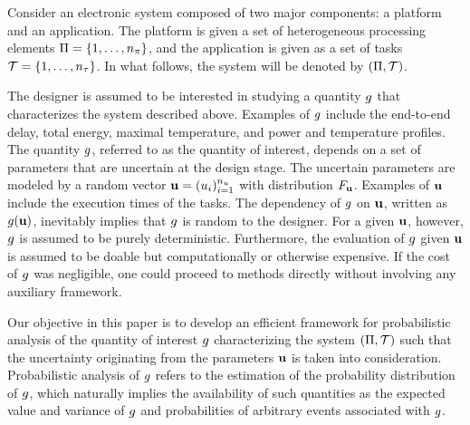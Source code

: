 Consider an electronic system composed of two major components: a platform and
an application. The platform is given a set of heterogeneous processing elements
$\Pi = \{ 1, \dots, {n_\pi} \}$, and the application is given as a set of tasks
$\mathcal{T} = \{ 1, \dots, {n_\tau} \}$. In what follows, the system will be denoted by
$(\Pi, \mathcal{T})$.

The designer is assumed to be interested in studying a quantity $g$ that
characterizes the system described above. Examples of $g$ include the
end-to-end delay, total energy, maximal temperature, and power and temperature
profiles. The quantity $g$, referred to as the quantity of interest, depends on
a set of parameters that are uncertain at the design stage. The uncertain
parameters are modeled by a random vector $\mathbf{u} = (u_i)_{i = 1}^{n_u}$ with
distribution $F_{\mathbf{u}}$. Examples of $\mathbf{u}$ include the execution times
of the tasks. The dependency of $g$ on $\mathbf{u}$, written as $g(\mathbf{u})$, inevitably
implies that $g$ is random to the designer. For a given $\mathbf{u}$, however, $g$ is
assumed to be purely deterministic. Furthermore, the evaluation of $g$ given
$\mathbf{u}$ is assumed to be doable but computationally or otherwise expensive. If the
cost of $g$ was negligible, one could proceed to  methods directly
without involving any auxiliary framework.

Our objective in this paper is to develop an efficient framework for
probabilistic analysis of the quantity of interest $g$ characterizing the
system $(\Pi, \mathcal{T})$ such that the uncertainty originating from the
parameters $\mathbf{u}$ is taken into consideration. Probabilistic analysis of $g$
refers to the estimation of the probability distribution of $g$, which
naturally implies the availability of such quantities as the expected value and
variance of $g$ and probabilities of arbitrary events associated with $g$.
